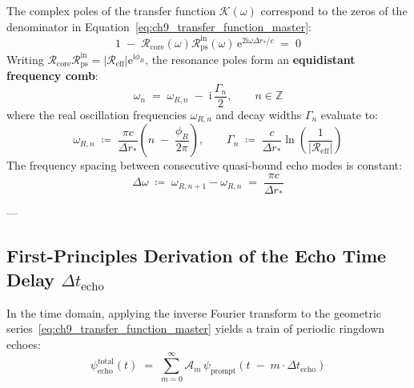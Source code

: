 \documentclass[
    12pt,
    a4paper,
    headings=normal,
    twoside=false,
    open=any,
    parskip=half
]{scrbook}
\newcommand{\iu}{\mathrm{i}}
\newcommand{\eu}{\mathrm{e}}
\begin{document}
\begin{phystheorem}\label{thm:ch9_resolvent_pole_comb}
The complex poles of the transfer function $\mathcal{K}(\omega)$ correspond to the zeros of the denominator in Equation~\eqref{eq:ch9_transfer_function_master}:
\begin{equation}
1 \;-\; \mathcal{R}_{\text{core}}(\omega) \mathcal{R}_{\text{ps}}^{\text{in}}(\omega) \, \eu^{2\iu\omega\Delta r_*/c} \;=\; 0
\end{equation}
Writing $\mathcal{R}_{\text{core}} \mathcal{R}_{\text{ps}}^{\text{in}} = |\mathcal{R}_{\text{eff}}| \eu^{\iu\phi_R}$, the resonance poles form an \textbf{equidistant frequency comb}:
\begin{equation}
\boxed{\omega_n \;=\; \omega_{R, n} \;-\; \iu \, \frac{\Gamma_n}{2}, \qquad n \in \mathbb{Z}}
\label{eq:ch9_resolvent_comb_formula}
\end{equation}
where the real oscillation frequencies $\omega_{R, n}$ and decay widths $\Gamma_n$ evaluate to:
\begin{equation}
\omega_{R, n} \;\coloneqq\; \frac{\pi c}{\Delta r_*} \left( n \;-\; \frac{\phi_R}{2\pi} \right), \qquad \Gamma_n \;\coloneqq\; \frac{c}{\Delta r_*} \ln\left( \frac{1}{\left|\mathcal{R}_{\text{eff}}\right|} \right)
\end{equation}
The frequency spacing between consecutive quasi-bound echo modes is constant:
\begin{equation}
\boxed{\Delta\omega \;\coloneqq\; \omega_{R, n+1} - \omega_{R, n} \;=\; \frac{\pi c}{\Delta r_*}}
\end{equation}
\end{phystheorem}

---

\subsection{First-Principles Derivation of the Echo Time Delay $\Delta t_{\text{echo}}$}

In the time domain, applying the inverse Fourier transform to the geometric series~\eqref{eq:ch9_transfer_function_master} yields a train of periodic ringdown echoes:
\begin{equation}
\psi_{\text{echo}}^{\text{total}}(t) \;=\; \sum_{m=0}^\infty \mathcal{A}_m \, \psi_{\text{prompt}}\left( t \;-\; m \cdot \Delta t_{\text{echo}} \right)
\label{eq:ch9_time_domain_echo_train}
\end{equation}
\end{document}
